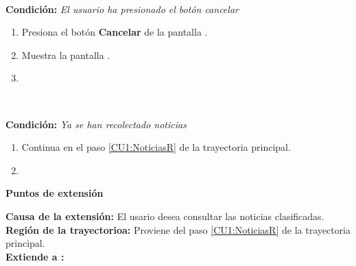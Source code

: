 \begin{large}
	\\
\end{large}	
\textbf{Condición:} \textit{El usuario ha presionado el botón cancelar}

\begin{enumerate}[{A-}1.]

	\item \actor Presiona el botón \textbf{Cancelar} de la pantalla .

	\item \sistema Muestra la pantalla .

	\item \finTA

\end{enumerate}


\begin{large}
	\\
\end{large}	
\textbf{Condición:} \textit{Ya se han recolectado noticias}

\begin{enumerate}[{B-}1.]

	\item \actor Continua en el paso \ref{CU1:NoticiasR} de la trayectoria principal.

	\item \finTA

\end{enumerate}





\begin{large}
	\textbf{Puntos de extensión}\\
\end{large}	

\textbf{Causa de la extensión:} El usario desea consultar las noticias clasificadas.\\
\textbf{Región de la trayectorioa:} Proviene del paso \ref{CU1:NoticiasR} de la trayectoria principal.\\
\textbf{Extiende a :} \\\\


